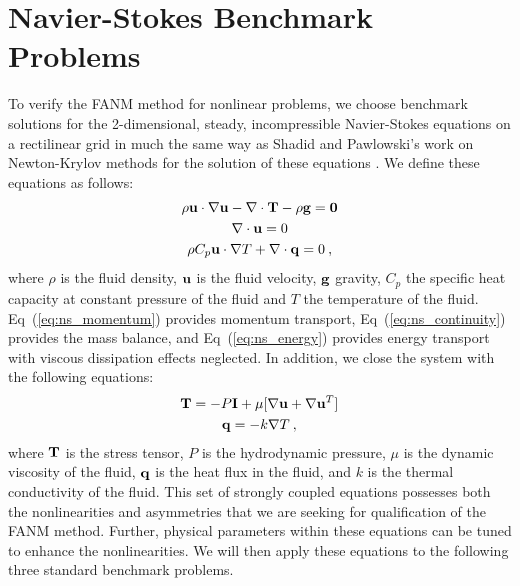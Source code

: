 \section{Navier-Stokes Benchmark Problems}
\label{sec:ns_benchmarks}
To verify the FANM method for nonlinear problems, we choose benchmark
solutions for the 2-dimensional, steady, incompressible Navier-Stokes
equations on a rectilinear grid in much the same way as Shadid and
Pawlowski's work on Newton-Krylov methods for the solution of these
equations \citep{shadid_inexact_1997,pawlowski_globalization_2006}. We
define these equations as follows:
\begin{subequations}
  \begin{gather}
    \rho \mathbf{u} \cdot \nabla \mathbf{u} - \nabla \cdot \mathbf{T} - \rho
    \mathbf{g} = \mathbf{0}
    \label{eq:ns_momentum}\\
    \nabla \cdot \mathbf{u} = 0
    \label{eq:ns_continuity}\\
    \rho C_p \mathbf{u} \cdot \nabla T + \nabla \cdot \mathbf{q} = 0\:,
    \label{eq:ns_energy}
  \end{gather}
  \label{eq:navier_stokes}
\end{subequations}
where $\rho$ is the fluid density, $\mathbf{u}$ is the fluid velocity,
$\mathbf{g}$ gravity, $C_p$ the specific heat capacity at constant
pressure of the fluid and $T$ the temperature of the
fluid. Eq~(\ref{eq:ns_momentum}) provides momentum transport,
Eq~(\ref{eq:ns_continuity}) provides the mass balance, and
Eq~(\ref{eq:ns_energy}) provides energy transport with viscous
dissipation effects neglected. In addition, we close the system with
the following equations:
\begin{subequations}
  \begin{gather}
    \mathbf{T} = -P \mathbf{I} + \mu[\nabla \mathbf{u} + \nabla \mathbf{u}^T]
    \label{eq:ns_stress_tensor}\\
    \mathbf{q} = - k \nabla T\:,
    \label{eq:ns_heat_flux}
  \end{gather}
  \label{eq:ns_closure}
\end{subequations}
where $\mathbf{T}$ is the stress tensor, $P$ is the hydrodynamic pressure,
$\mu$ is the dynamic viscosity of the fluid, $\mathbf{q}$ is the heat flux
in the fluid, and $k$ is the thermal conductivity of the fluid. This
set of strongly coupled equations possesses both the nonlinearities
and asymmetries that we are seeking for qualification of the FANM
method. Further, physical parameters within these equations can be
tuned to enhance the nonlinearities. We will then apply these
equations to the following three standard benchmark problems.

